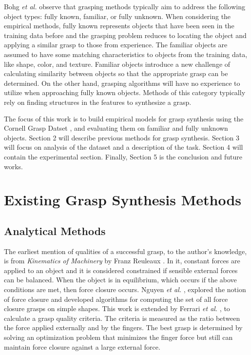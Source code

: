 \documentclass{article}
\begin{document}
Bohg \textit{et al.} \cite{bohg14} observe that grasping methods typically aim
to address the following object types: fully known, familiar, or fully unknown.
When considering the empirical methods, fully known represents objects that
have been seen in the training data before and the grasping problem reduces to
locating the object and applying a similar grasp to those from experience.
The familiar objects are assumed to have some matching characteristics to objects
from the training data, like shape, color, and texture. Familiar objects
introduce a new challenge of calculating similarity between objects so that
the appropriate grasp can be determined. On the other hand, grasping algorithms
will have no experience to utilize when approaching fully known objects. Methods
of this category typically rely on finding structures in the features to
synthesize a grasp.

The focus of this work is to build empirical models for grasp synthesis using
the Cornell Grasp Datset \cite{lenz15}, and evaluating them on familiar and
fully unknown objects. Section 2 will describe previous methods for grasp
synthesis. Section 3 will focus on analysis of the dataset and a description
of the task. Section 4 will contain the experimental section. Finally, Section
5 is the conclusion and future works.

\section{Existing Grasp Synthesis Methods}
\subsection{Analytical Methods}
The earliest mention of qualities of a successful grasp, to the author's
knowledge, is from \textit{Kinematics of Machinery} by Franz Reuleaux
\cite{reuleaux76}.
In it, constant forces are applied to an object and it is considered
constrained if sensible external forces can be balanced. When the
object is in equilibrium, which occurs if the above conditions are
met, then force closure occurs. Nguyen \textit{et al.} \cite{nguyen86},
explored the notion of force closure and developed algorithms for computing
the set of all force closure grasps on simple shapes.
This work is extended by Ferrari \textit{et al.} \cite{ferrari92}, to calculate
a grasp quality criteria. The criteria is measured as the ratio between the force
applied externally and by the fingers. The best grasp is determined by solving
an optimization problem that minimizes the finger force but still can maintain
force closure against a large external force.
\end{document}
